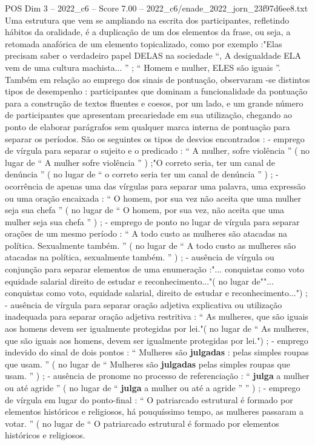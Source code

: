 \begin{textsample}{POS Dim 3 – 2022\_c6 – Score 7.00 – 2022\_c6/enade\_2022\_jorn\_23f97d6ee8.txt}
Uma estrutura que vem se ampliando na escrita dos participantes, refletindo hábitos da oralidade, é a duplicação de um dos elementos da frase, ou seja, a retomada anafórica de um elemento topicalizado, como por exemplo :"Elas precisam saber o verdadeiro papel DELAS na sociedade “, A desigualdade ELA vem de uma cultura machista... ” ; “ Homem e mulher, ELES são iguais ”.
Também em relação ao emprego dos sinais de pontuação, observaram -se distintos tipos de desempenho : participantes que dominam a funcionalidade da pontuação para a construção de textos fluentes e coesos, por um lado, e um grande número de participantes que apresentam precariedade em sua utilização, chegando ao ponto de elaborar parágrafos sem qualquer marca interna de pontuação para separar os períodos.
São os seguintes os tipos de desvios encontrados : - emprego de vírgula para separar o sujeito e o predicado : “ A mulher, sofre violência ” ( no lugar de “ A mulher sofre violência ” ) ;"O correto seria, ter um canal de denúncia ” ( no lugar de “ o correto seria ter um canal de denúncia ” ) ; - ocorrência de apenas uma das vírgulas para separar uma palavra, uma expressão ou uma oração encaixada : “ O homem, por sua vez não aceita que uma mulher seja sua chefa ” ( no lugar de “ O homem, por sua vez, não aceita que uma mulher seja sua chefa ” ) ; - emprego de ponto no lugar de vírgula para separar orações de um mesmo período : “ A todo custo as mulheres são atacadas na política.
Sexualmente também. ” ( no lugar de “ A todo custo as mulheres são atacadas na política, sexualmente também. ” ) ; - ausência de vírgula ou conjunção para separar elementos de uma enumeração :"... conquistas como voto equidade salarial direito de estudar e reconhecimento..."( no lugar de""... conquistas como voto, equidade salarial, direito de estudar e reconhecimento...") ; - ausência de vírgula para separar oração adjetiva explicativa ou utilização inadequada para separar oração adjetiva restritiva : “ As mulheres, que são iguais aos homens devem ser igualmente protegidas por lei."( no lugar de “ As mulheres, que são iguais aos homens, devem ser igualmente protegidas por lei.") ; - emprego indevido do sinal de dois pontos : “ Mulheres são \textbf{julgadas} : pelas simples roupas que usam. ” ( no lugar de “ Mulheres são \textbf{julgadas} pelas simples roupas que usam. ” ) ; - ausência de pronome no processo de referenciação : “ \textbf{julga} a mulher ou até agride ” ( no lugar de “ \textbf{julga} a mulher ou até a agride ” ” ) ; - emprego de vírgula em lugar do ponto-final : “ O patriarcado estrutural é formado por elementos históricos e religiosos, há pouquíssimo tempo, as mulheres passaram a votar. ” ( no lugar de “ O patriarcado estrutural é formado por elementos históricos e religiosos.

\end{textsample}
